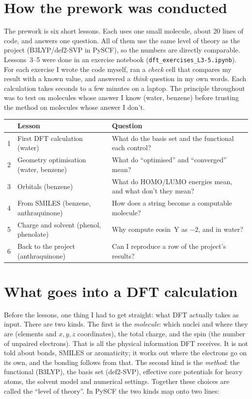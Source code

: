 \documentclass[11pt,a4paper]{article}
\begin{document}
\section{How the prework was conducted}

The prework is six short lessons. Each uses one small molecule, about 20 lines of code, and
answers one question. All of them use the same level of theory as the project (B3LYP/def2-SVP in
PySCF), so the numbers are directly comparable. Lessons~3--5 were done in an exercise notebook
(\texttt{dft\_exercises\_L3-5.ipynb}). For each exercise I wrote the code myself, ran a
\emph{check} cell that compares my result with a known value, and answered a \emph{think}
question in my own words. Each calculation takes seconds to a few minutes on a laptop. The
principle throughout was to test on molecules whose answer I know (water, benzene) before trusting
the method on molecules whose answer I don't.

\begin{center}\small
\begin{tabularx}{\linewidth}{@{}clX@{}}
\toprule
& Lesson & Question \\
\midrule
1 & First DFT calculation (water) & What do the basis set and the functional each control? \\
2 & Geometry optimisation (water, benzene) & What do ``optimised'' and ``converged'' mean? \\
3 & Orbitals (benzene) & What do HOMO/LUMO energies mean, and what don't they mean? \\
4 & From SMILES (benzene, anthraquinone) & How does a string become a computable molecule? \\
5 & Charge and solvent (phenol, phenolate) & Why compute eosin~Y as $-2$, and in water? \\
6 & Back to the project (anthraquinone) & Can I reproduce a row of the project's results? \\
\bottomrule
\end{tabularx}
\end{center}

\section{What goes into a DFT calculation}

Before the lessons, one thing I had to get straight: what DFT actually takes as input. There are
two kinds. The first is the \emph{molecule}: which nuclei and where they are (elements and $x, y, z$
coordinates), the total charge, and the spin (the number of unpaired electrons). That is all the
physical information DFT receives. It is not told about bonds, SMILES or aromaticity; it works out
where the electrons go on its own, and the bonding follows from that. The second kind is the
\emph{method}: the functional (B3LYP), the basis set (def2-SVP), effective core potentials for
heavy atoms, the solvent model and numerical settings. Together these choices are called the
``level of theory''. In PySCF the two kinds map onto two lines:
\end{document}
